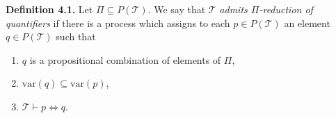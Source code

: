 \textbf{Definition 4.1.} Let $\Pi \subseteq P(\mathcal{T})$. We say that $\mathcal{T}$ \textit{admits $\Pi$-reduction of quantifiers} if there is a process which assigns to each $p \in P(\mathcal{T})$ an element $q \in P(\mathcal{T})$ such that
\begin{enumerate}
  \item[(i)] $q$ is a propositional combination of elements of $\Pi$,
  \item[(ii)] $\text{var}(q) \subseteq \text{var}(p)$,
  \item[(iii)] $\mathcal{T} \vdash p \Leftrightarrow q$.
\end{enumerate}
